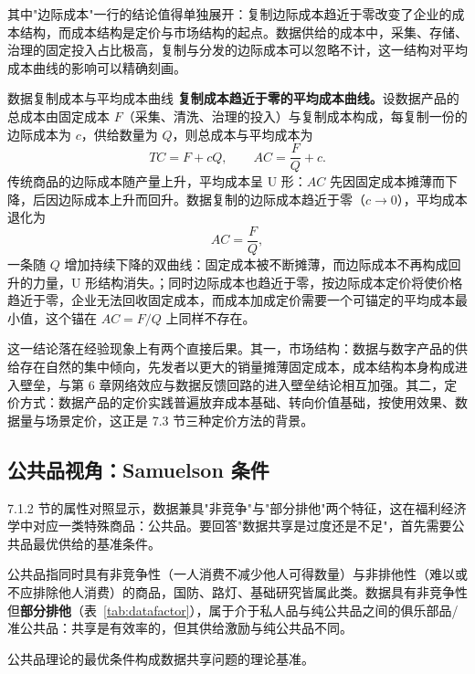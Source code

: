 其中"边际成本"一行的结论值得单独展开：复制边际成本趋近于零改变了企业的成本结构，而成本结构是定价与市场结构的起点。数据供给的成本中，采集、存储、治理的固定投入占比极高，复制与分发的边际成本可以忽略不计，这一结构对平均成本曲线的影响可以精确刻画。

\begin{derivation}{数据复制成本与平均成本曲线}{}
\textbf{复制成本趋近于零的平均成本曲线。}设数据产品的总成本由固定成本 $F$（采集、清洗、治理的投入）与复制成本构成，每复制一份的边际成本为 $c$，供给数量为 $Q$，则总成本与平均成本为
\[
TC = F + cQ, \qquad AC = \frac{F}{Q} + c.
\]
传统商品的边际成本随产量上升，平均成本呈 U 形：$AC$ 先因固定成本摊薄而下降，后因边际成本上升而回升。数据复制的边际成本趋近于零（$c \to 0$），平均成本退化为
\[
AC = \frac{F}{Q},
\]
一条随 $Q$ 增加持续下降的双曲线：固定成本被不断摊薄，而边际成本不再构成回升的力量，U 形结构消失。；同时边际成本也趋近于零，按边际成本定价将使价格趋近于零，企业无法回收固定成本，而成本加成定价需要一个可锚定的平均成本最小值，这个锚在 $AC = F/Q$ 上同样不存在。
\end{derivation}

这一结论落在经验现象上有两个直接后果。其一，市场结构：数据与数字产品的供给存在自然的集中倾向，先发者以更大的销量摊薄固定成本，成本结构本身构成进入壁垒，与第 6 章网络效应与数据反馈回路的进入壁垒结论相互加强。其二，定价方式：数据产品的定价实践普遍放弃成本基础、转向价值基础，按使用效果、数据量与场景定价，这正是 7.3 节三种定价方法的背景。

\subsection{公共品视角：Samuelson 条件}

7.1.2 节的属性对照显示，数据兼具"非竞争"与"部分排他"两个特征，这在福利经济学中对应一类特殊商品：公共品。要回答"数据共享是过度还是不足"，首先需要公共品最优供给的基准条件。

\begin{definition}
公共品指同时具有非竞争性（一人消费不减少他人可得数量）与非排他性（难以或不应排除他人消费）的商品，国防、路灯、基础研究皆属此类。数据具有非竞争性但\textbf{部分排他}（表~\ref{tab:datafactor}），属于介于私人品与纯公共品之间的俱乐部品/准公共品：共享是有效率的，但其供给激励与纯公共品不同。
\end{definition}

公共品理论的最优条件构成数据共享问题的理论基准。

